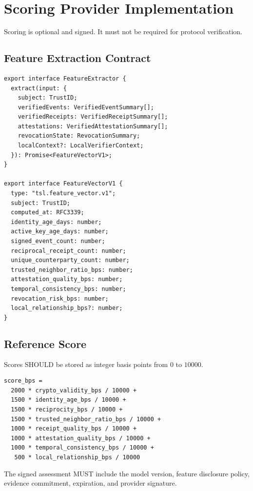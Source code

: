 \documentclass[11pt]{article}
\begin{document}
\section{Scoring Provider Implementation}

Scoring is optional and signed. It must not be required for protocol verification.

\subsection{Feature Extraction Contract}

\begin{lstlisting}[style=tslcode]
export interface FeatureExtractor {
  extract(input: {
    subject: TrustID;
    verifiedEvents: VerifiedEventSummary[];
    verifiedReceipts: VerifiedReceiptSummary[];
    attestations: VerifiedAttestationSummary[];
    revocationState: RevocationSummary;
    localContext?: LocalVerifierContext;
  }): Promise<FeatureVectorV1>;
}

export interface FeatureVectorV1 {
  type: "tsl.feature_vector.v1";
  subject: TrustID;
  computed_at: RFC3339;
  identity_age_days: number;
  active_key_age_days: number;
  signed_event_count: number;
  reciprocal_receipt_count: number;
  unique_counterparty_count: number;
  trusted_neighbor_ratio_bps: number;
  attestation_quality_bps: number;
  temporal_consistency_bps: number;
  revocation_risk_bps: number;
  local_relationship_bps?: number;
}
\end{lstlisting}

\subsection{Reference Score}

Scores SHOULD be stored as integer basis points from \(0\) to \(10000\).

\begin{lstlisting}[style=tslcode]
score_bps =
  2000 * crypto_validity_bps / 10000 +
  1500 * identity_age_bps / 10000 +
  1500 * reciprocity_bps / 10000 +
  1500 * trusted_neighbor_ratio_bps / 10000 +
  1000 * receipt_quality_bps / 10000 +
  1000 * attestation_quality_bps / 10000 +
  1000 * temporal_consistency_bps / 10000 +
   500 * local_relationship_bps / 10000
\end{lstlisting}

The signed assessment MUST include the model version, feature disclosure policy, evidence commitment, expiration, and provider signature.
\end{document}
